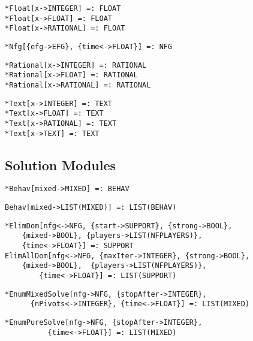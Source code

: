 \protect \large \begin{verbatim}
*Float[x->INTEGER] =: FLOAT
*Float[x->FLOAT] =: FLOAT
*Float[x->RATIONAL] =: FLOAT
\end{verbatim} \normalsize

\protect \large \begin{verbatim}
*Nfg[{efg->EFG}, {time<->FLOAT}] =: NFG
\end{verbatim}\normalsize

\protect \large \begin{verbatim}
*Rational[x->INTEGER] =: RATIONAL
*Rational[x->FLOAT] =: RATIONAL
*Rational[x->RATIONAL] =: RATIONAL
\end{verbatim} \normalsize

\protect \large \begin{verbatim}
*Text[x->INTEGER] =: TEXT
*Text[x->FLOAT] =: TEXT
*Text[x->RATIONAL] =: TEXT
*Text[x->TEXT] =: TEXT
\end{verbatim} \normalsize



\medskip
\subsection{Solution Modules}

\protect \large \begin{verbatim}
*Behav[mixed->MIXED] =: BEHAV
\end{verbatim}\normalsize

\protect \large \begin{verbatim}
Behav[mixed->LIST(MIXED)] =: LIST(BEHAV)
\end{verbatim}\normalsize

\protect \large \begin{verbatim}
*ElimDom[nfg<->NFG, {start->SUPPORT}, {strong->BOOL}, 
	{mixed->BOOL}, {players->LIST(NFPLAYERS)}, 
	{time<->FLOAT}] =: SUPPORT
ElimAllDom[nfg<->NFG, {maxIter->INTEGER}, {strong->BOOL}, 
	{mixed->BOOL},	{players->LIST(NFPLAYERS)},
        {time<->FLOAT}] =: LIST(SUPPORT)
\end{verbatim} \normalsize

\protect \large \begin{verbatim}
*EnumMixedSolve[nfg->NFG, {stopAfter->INTEGER},
      {nPivots<->INTEGER}, {time<->FLOAT}] =: LIST(MIXED)
\end{verbatim}\normalsize

\protect \large \begin{verbatim}
*EnumPureSolve[nfg->NFG, {stopAfter->INTEGER}, 
          {time<->FLOAT}] =: LIST(MIXED) 
\end{verbatim}\normalsize

